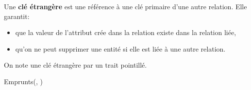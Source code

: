 \documentclass[svgnames,11pt]{beamer}
\begin{document}
\begin{frame}
    \frametitle{}

    \begin{aretenir}[]
        Une \textbf{clé étrangère} est une référence à une clé primaire d'une autre relation. Elle garantit:
        \begin{itemize}
        \item que la valeur de l'attribut crée dans la relation existe dans la relation liée,
        \item qu'on ne peut supprimer une entité si elle est liée à une autre relation.
        \end{itemize}
    \end{aretenir}
    On note une clé étrangère par un trait pointillé.
\begin{center}
    Emprunts(\underline{}, )
\end{center}
\end{frame}
\end{document}
